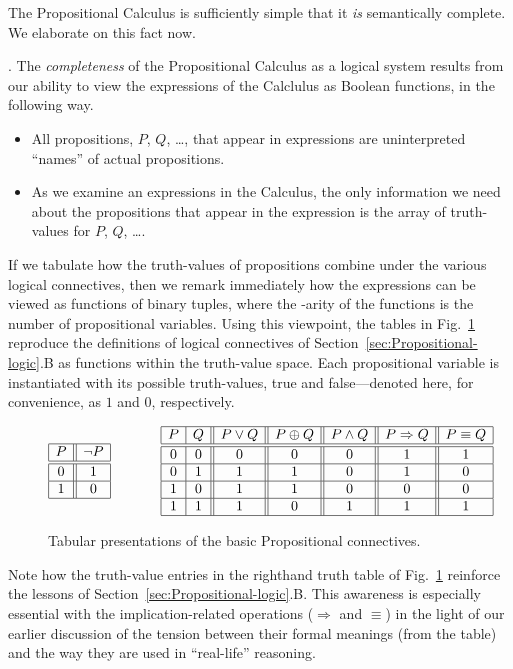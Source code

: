 The Propositional Calculus is sufficiently simple that it {\em is}
semantically complete.  We elaborate on this fact now.

\bigskip

.
The {\em completeness} of the Propositional Calculus as a logical
system results from our ability to view the expressions of the
Calclulus as Boolean functions, in the following way.
\begin{itemize}
\item
All propositions, $P$, $Q$, \ldots, that appear in expressions are
uninterpreted ``names'' of actual propositions.
\item
As we examine an expressions in the Calculus, the only information we
need about the propositions that appear in the expression is the array
of truth-values for $P$, $Q$, \ldots.
\end{itemize}
If we tabulate how the truth-values of propositions combine under the
various logical connectives, then we remark immediately how the
expressions can be viewed as functions of binary tuples, where the
-arity of the functions is the number of propositional variables.
Using this viewpoint, the tables in Fig.~\ref{fig:defns-via-tables}
reproduce the definitions of logical connectives of
Section~\ref{sec:Propositional-logic}.B as functions within the
truth-value space.  Each propositional variable is instantiated with
its possible truth-values, {\sc true} and {\sc false}---denoted here,
for convenience, as $1$ and $0$, respectively.
\begin{figure}[hbt]
\[
\begin{array}{|c||c|}
\hline
P & \neg P \\
\hline
\hline
0 & 1 \\
\hline
1 & 0 \\
\hline
\end{array}
\hspace*{.5in}
\begin{array}{|c|c||c||c||c||c||c|}
\hline
P & Q & P \vee Q  & P \oplus Q & P \wedge Q & P \Rightarrow Q & P \equiv Q  \\
\hline
\hline
0 & 0 & 0 & 0 & 0 & 1 & 1 \\
\hline
0 & 1 & 1 & 1 & 0 & 1 & 0 \\
\hline
1 & 0 & 1 & 1 & 0 & 0 & 0 \\
\hline
1 & 1 & 1 & 0 & 1 & 1 & 1 \\
\hline
\end{array}
\]
\caption{Tabular presentations of the basic Propositional connectives.
\label{fig:defns-via-tables}}
\end{figure}
Note how the truth-value entries in the righthand truth table of
Fig.~\ref{fig:defns-via-tables} reinforce the lessons of
Section~\ref{sec:Propositional-logic}.B.  This awareness is especially
essential with the implication-related operations ($\Rightarrow$ and
$\equiv$) in the light of our earlier discussion of the tension
between their formal meanings (from the table) and the way they are
used in ``real-life'' reasoning.

